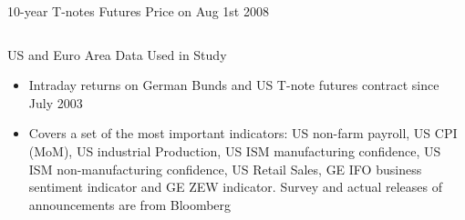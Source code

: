 \documentclass[final]{beamer}
\begin{document}
\begin{frame}
\begin{columns}[t]
\begin{column}{.53 \linewidth}
\begin{columns}[c]
\begin{column}{.48 \linewidth}
\begin{block}{10-year T-notes Futures Price on Aug 1st 2008}
\end{block}
%

\end{column}%

\end{columns}%

\vspace{.4 cm}%

%      
%
%
%
\begin{block}{US and Euro Area Data Used in Study}
      
\begin{itemize}
\item Intraday returns on German Bunds and US T-note futures contract since July 2003

\item Covers a set of the most important indicators: US non-farm payroll,
US CPI (MoM), US industrial Production, US ISM manufacturing confidence, US
ISM non-manufacturing confidence, US Retail Sales, GE IFO business sentiment
indicator and GE ZEW indicator. Survey and actual releases of announcements are from Bloomberg


\end{itemize}
\end{block}
\end{column}
\end{columns}
\end{frame}
\end{document}
